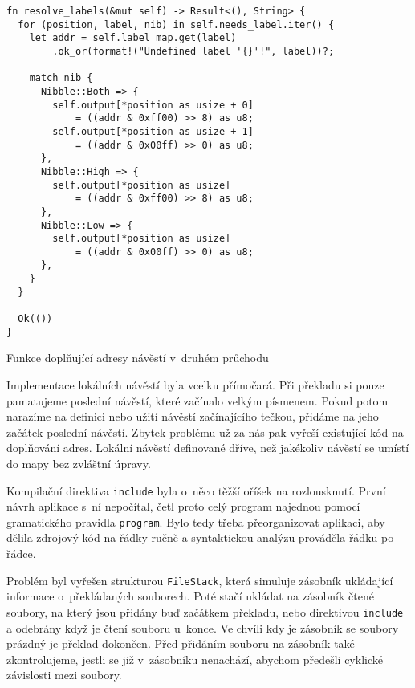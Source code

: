 \begin{listing}[htbp]
\begin{verbatim}
fn resolve_labels(&mut self) -> Result<(), String> {
  for (position, label, nib) in self.needs_label.iter() {
    let addr = self.label_map.get(label)
        .ok_or(format!("Undefined label '{}'!", label))?;

    match nib {
      Nibble::Both => {
        self.output[*position as usize + 0]
            = ((addr & 0xff00) >> 8) as u8;
        self.output[*position as usize + 1]
            = ((addr & 0x00ff) >> 0) as u8;
      },
      Nibble::High => {
        self.output[*position as usize]
            = ((addr & 0xff00) >> 8) as u8;
      },
      Nibble::Low => {
        self.output[*position as usize]
            = ((addr & 0x00ff) >> 0) as u8;
      },
    }
  }

  Ok(())
}
\end{verbatim}
\caption{Funkce doplňující adresy návěstí v~druhém průchodu}
\label{fig:rust-second-pass}
\end{listing}

Implementace lokálních návěstí byla vcelku přímočará. Při překladu si pouze pamatujeme poslední návěstí, které začínalo velkým písmenem. Pokud potom narazíme na definici nebo užití návěstí začínajícího tečkou, přidáme na jeho začátek poslední  návěstí. Zbytek problému už za nás pak vyřeší existující kód na doplňování adres. Lokální návěstí definované dříve, než jakékoliv  návěstí se umístí do mapy bez zvláštní úpravy.

Kompilační direktiva \texttt{include} byla o~něco těžší oříšek na rozlousknutí. První návrh aplikace s~ní nepočítal, četl proto celý program najednou pomocí gramatického pravidla \texttt{program}. Bylo tedy třeba přeorganizovat aplikaci, aby dělila zdrojový kód na řádky ručně a syntaktickou analýzu prováděla řádku po řádce.

Problém byl vyřešen strukturou \texttt{FileStack}, která simuluje zásobník u\-klá\-da\-jí\-cí informace o~překládaných souborech. Poté stačí ukládat na zásobník čtené soubory, na který jsou přidány buď začátkem překladu, nebo direktivou \texttt{include} a odebrány když je čtení souboru u~konce. Ve chvíli kdy je zásobník se soubory prázdný je překlad dokončen. Před přidáním souboru na zásobník také zkontrolujeme, jestli se již v~zásobníku nenachází, abychom předešli cyklické závislosti mezi soubory.

